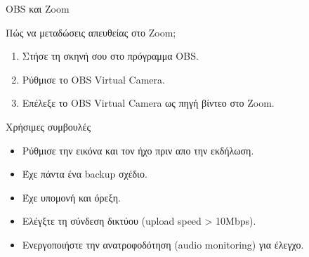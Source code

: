 \documentclass[aspectratio=169]{beamer}
\begin{document}
\begin{frame}{OBS και Zoom}
  \begin{block}{Πώς να μεταδώσεις απευθείας στο Zoom;}
    \begin{enumerate}
    \item Στήσε τη σκηνή σου στο πρόγραμμα OBS.
    \item Ρύθμισε το OBS Virtual Camera.
    \item Επέλεξε το OBS Virtual Camera ως πηγή βίντεο στο Zoom.
    \end{enumerate}
  \end{block}
    \begin{exampleblock}{Χρήσιμες συμβουλές}
    \begin{itemize}
    \item Ρύθμισε την εικόνα και τον ήχο πριν απο την εκδήλωση.
    \item Έχε πάντα ένα backup σχέδιο.
    \item Έχε υπομονή και όρεξη.
    \item Ελέγξτε τη σύνδεση δικτύου (upload speed > 10Mbps).
    \item Ενεργοποιήστε την ανατροφοδότηση (audio monitoring) για έλεγχο.
    \end{itemize}
  \end{exampleblock}
  \end{frame}
\end{document}
